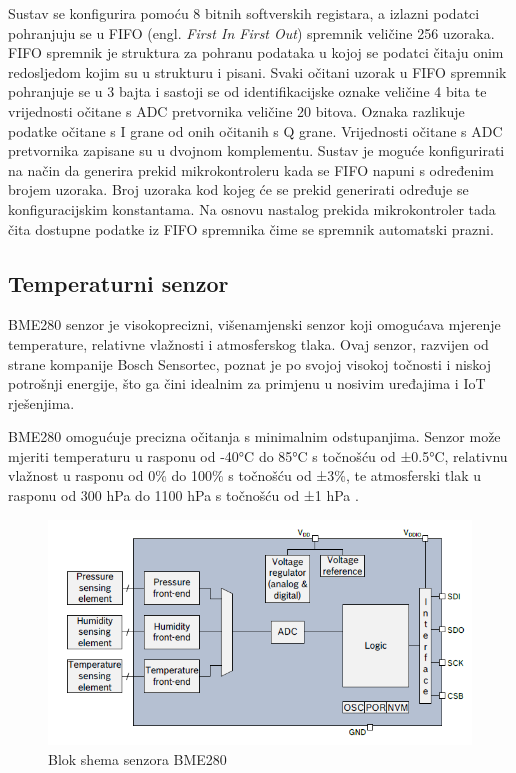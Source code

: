 \documentclass[../diplomski_rad.tex]{subfiles}
\begin{document}
Sustav se konfigurira pomoću 8 bitnih softverskih registara, a izlazni podatci pohranjuju se u 
FIFO (engl. \textit{First In First Out}) spremnik veličine 256 uzoraka.
FIFO spremnik je struktura za pohranu podataka u kojoj se podatci čitaju onim redosljedom kojim su u strukturu i pisani. 
Svaki očitani uzorak u FIFO spremnik pohranjuje se u 3 bajta i sastoji se od identifikacijske oznake veličine 4 bita te vrijednosti očitane s ADC 
pretvornika veličine 20 bitova. 
Oznaka razlikuje podatke očitane s I grane od onih očitanih s Q grane.
Vrijednosti očitane s ADC pretvornika zapisane su u dvojnom komplementu. 
Sustav je moguće konfigurirati na način da generira prekid mikrokontroleru kada se FIFO napuni s određenim brojem uzoraka. 
Broj uzoraka kod kojeg će se prekid generirati određuje se konfiguracijskim konstantama. Na osnovu nastalog prekida 
mikrokontroler tada čita dostupne podatke iz FIFO spremnika čime se spremnik automatski prazni.  

\subsection{Temperaturni senzor}

BME280 senzor je visokoprecizni, višenamjenski senzor koji omogućava mjerenje temperature, 
relativne vlažnosti i atmosferskog tlaka. 
Ovaj senzor, razvijen od strane kompanije Bosch Sensortec, poznat je po svojoj visokoj točnosti i 
niskoj potrošnji energije, što ga čini idealnim za primjenu u nosivim uređajima i IoT rješenjima.

BME280 omogućuje precizna očitanja s minimalnim odstupanjima. 
Senzor može mjeriti temperaturu u rasponu od -40°C do 85°C s točnošću od ±0.5°C, 
relativnu vlažnost u rasponu od 0\% do 100\% s točnošću od ±3\%, te atmosferski tlak u 
rasponu od 300 hPa do 1100 hPa s točnošću od ±1 hPa \cite{bme280_datasheet}.

\begin{figure}[htb]
    \centering
    \includegraphics[width=1\textwidth]{Figures/bme280.png} 
    \caption{Blok shema senzora BME280\cite{bme280_datasheet}}
    \label{slk:shema_bme280}
\end{figure}
\end{document}
